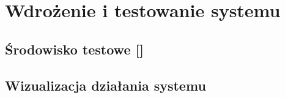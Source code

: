\newpage\section{Wdrożenie i testowanie systemu \NazwaSys} \label{sec:testy}
\subsection{Środowisko testowe [\StudentA]}

\subsection{Wizualizacja działania systemu \textsl{\NazwaSys}}

 
